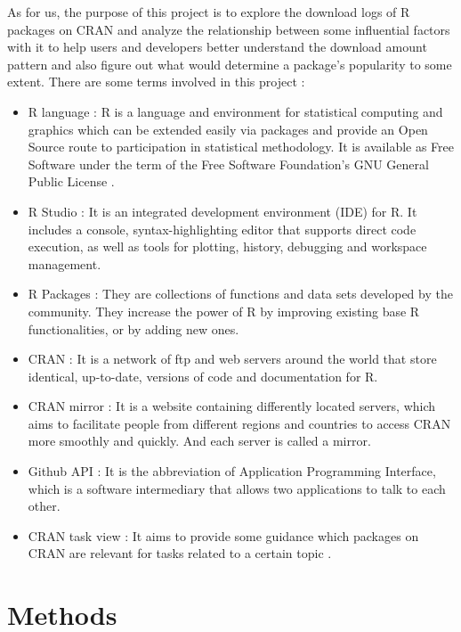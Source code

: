 \documentclass[
]{book}
\begin{document}
As for us, the purpose of this project is to explore the download logs of R packages on CRAN and analyze the relationship between some influential factors with it to help users and developers better understand the download amount pattern and also figure out what would determine a package's popularity to some extent. There are some terms involved in this project :

\begin{itemize}
\item
  R language : R is a language and environment for statistical computing and graphics which can be extended easily via packages and provide an Open Source route to participation in statistical methodology. It is available as Free Software under the term of the Free Software Foundation's GNU General Public License \citep{gnu}.
\item
  R Studio : It is an integrated development environment (IDE) for R. It includes a console, syntax-highlighting editor that supports direct code execution, as well as tools for plotting, history, debugging and workspace management.\citep{rstudio}
\item
  R Packages : They are collections of functions and data sets developed by the community. They increase the power of R by improving existing base R functionalities, or by adding new ones.
\item
  CRAN : It is a network of ftp and web servers around the world that store identical, up-to-date, versions of code and documentation for R.\citep{CRAN}
\item
  CRAN mirror : It is a website containing differently located servers, which aims to facilitate people from different regions and countries to access CRAN more smoothly and quickly. And each server is called a mirror.\citep{cranmirror}
\item
  Github API : It is the abbreviation of Application Programming Interface, which is a software intermediary that allows two applications to talk to each other.
\item
  CRAN task view : It aims to provide some guidance which packages on CRAN are relevant for tasks related to a certain topic \citep{crantaskviews}.
\end{itemize}

\hypertarget{methods}{%
\chapter{Methods}\label{methods}}
\end{document}
